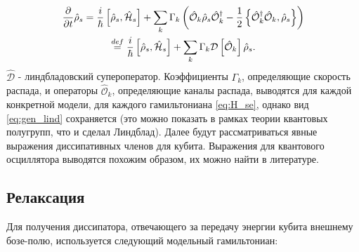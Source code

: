 \documentclass[12pt, twoside]{report}
\newcommand{\rbrkt}[1]{\left( #1 \right)}
\newcommand{\sbrkt}[1]{\left[ #1 \right]}
\numberwithin{equation}{section}
\numberwithin{figure}{section}
\begin{document}
\begin{gather}
 \frac{\partial}{\partial t}\hat \rho_s = \frac{i}{\hbar} \sbrkt{\hat \rho_s, \mathcal{\hat H}_s} +
\sum_k \Gamma_k \rbrkt{\mathcal{\hat O}_k \hat \rho_s \mathcal{\hat O}_k^\dag - \frac{1}{2} \left\{ \mathcal{\hat O}_k^\dag \mathcal{\hat O}_k, \hat \rho_s \right\} } \notag \\
\overset{def}{=} \frac{i}{\hbar}\sbrkt{\hat \rho_s, \mathcal{\hat H}_s} + \sum_k \Gamma_k \mathcal{D}\sbrkt{\mathcal{\hat O}_k}\hat \rho_s.
\label{eq:gen_lind}
\end{gather}
$\mathcal{\hat D}$ - линдбладовский супероператор. Коэффициенты $\Gamma_k$, определяющие скорость распада, и операторы $\mathcal{\hat O}_k$, определяющие каналы распада, выводятся\cite{carmichael1999} для каждой конкретной модели, для каждого гамильтониана \eqref{eq:H_se}, однако вид \eqref{eq:gen_lind} сохраняется (это можно показать в рамках теории квантовых полугрупп, что и сделал Линдблад\cite{lindblad1976}). Далее будут рассматриваться явные выражения диссипативных членов для кубита. Выражения для квантового осциллятора выводятся похожим образом, их можно найти в литературе.\cite{carmichael1999}

\subsection{Релаксация}

Для получения диссипатора, отвечающего за передачу энергии кубита внешнему бозе-полю, используется следующий модельный гамильтониан:
\end{document}
